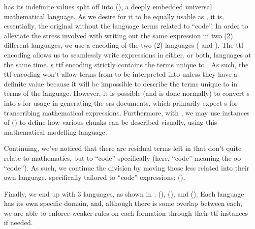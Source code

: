 \Expr{} has its indefinite values split off into \ModelExpr{}
(), a deeply embedded universal mathematical
language. As we desire for it to be equally usable as \Expr{}, it is,
essentially, the original \Expr{} without the language terms related to
``code''. In order to alleviate the stress involved with
writing out the same expression in two (2) different languages, we use a
 encoding of the two (2) languages ( and
). The \acs{ttf} encoding allows us to
seamlessly write expressions in either, or both, languages at the same time.
\ModelExpr{}s \acs{ttf} encoding strictly contains the terms unique to
\ModelExpr{}. As such, the \acs{ttf} encoding won't allow terms from
\ModelExpr{} to be interpreted into \Expr{} unless they have a definite value
because it will be impossible to describe the terms unique to \ModelExpr{} in
terms of the \Expr{} language. However, it is possible (and is done normally) to
convert \Expr{}s into \ModelExpr{}s for usage in generating the \acs{srs}
documents, which primarily expect \ModelExpr{}s for transcribing mathematical
expressions. Furthermore, with \ModelExpr{}, we may use instances of \Express{}
() to define how various chunks can be described
visually, using this mathematical modelling language.

\currentExpressHaskell{}

Continuing, we've noticed that there are residual terms left in \Expr{} that
don't quite relate to mathematics, but to ``code'' specifically (here, ``code''
meaning the \acs{oo} ``code''). As such, we continue the division by moving
those less related into their own language, specifically tailored to ``code''
expressions: \CodeExpr{} ().

Finally, we end up with 3 languages, as shown in : \Expr{}
(), \ModelExpr{} (), and
\CodeExpr{} (). Each language has its own
specific domain, and, although there is some overlap between each, we are able
to enforce weaker rules on each formation through their \acs{ttf} instances if
needed.

